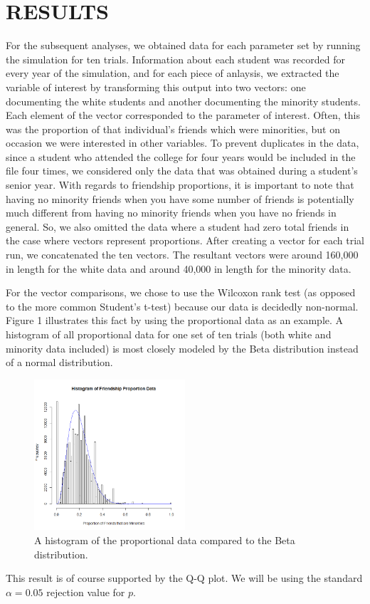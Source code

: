 
\section{RESULTS}
\label{sec:results}

For the subsequent analyses, we obtained data for each parameter set by running the simulation for ten trials. Information about each student was recorded for every year of the 
simulation, and for each piece of anlaysis, we extracted the variable of interest by transforming this output into two vectors: one documenting the white students and another documenting the minority students. Each element of the vector corresponded to the parameter of interest. Often, this was the proportion of that individual's friends which were 
minorities, but on occasion we were interested in other variables. To prevent duplicates in the data, since a student who attended the college for four years would be included in the file four 
times, we considered only the data that was obtained during a student's senior year. With regards to friendship proportions, it is important to note 
that having no minority friends when you have some number of friends is potentially much different from having no 
minority friends when you have no friends in general. So, we also omitted the data where a student had zero total friends in the case where vectors represent proportions.
After creating a vector for each trial run, we concatenated the ten vectors. The resultant vectors were around 160,000 in 
length for the white data and around 40,000 in length for the minority data.

For the vector comparisons, we chose to use the Wilcoxon rank test (as opposed to the more common Student's t-test) because our data is decidedly non-normal. Figure 1 illustrates this 
fact by using the proportional data as an example. A histogram of all proportional data for one set of ten trials (both white and minority data included) is most closely modeled by the Beta distribution instead of a normal distribution.
\begin{figure}[h]
  \centering
    \includegraphics[width=0.5\textwidth]{histogramProportionData.png}
      \caption{A histogram of the proportional data compared to the Beta distribution.}
\end{figure}
This result is of course supported by the Q-Q plot. We will be using the standard $\alpha=0.05$ rejection value for $p$.


